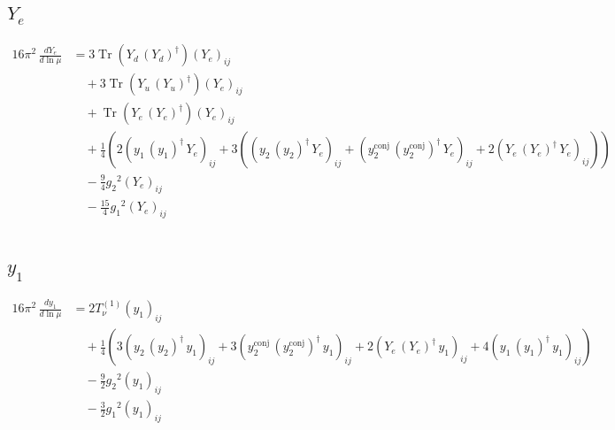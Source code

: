 \documentclass[10pt,a4paper]{article}
\begin{document}
\subsection*{$Y_e$}
\begin{align*}
16\pi^2\,\frac{d Y_e}{d\ln\mu} &=3 \operatorname{Tr}\!\left({Y_d}\,\left({Y_d}\right)^{\dagger}\right) \left({Y_e}\right)_{ij} \\
&\quad +3 \operatorname{Tr}\!\left({Y_u}\,\left({Y_u}\right)^{\dagger}\right) \left({Y_e}\right)_{ij} \\
&\quad +\operatorname{Tr}\!\left({Y_e}\,\left({Y_e}\right)^{\dagger}\right) \left({Y_e}\right)_{ij} \\
&\quad +\frac{1}{4} (2 \left({y_1}\,\left({y_1}\right)^{\dagger}\,{Y_e}\right)_{ij}+3 (\left({y_2}\,\left({y_2}\right)^{\dagger}\,{Y_e}\right)_{ij}+\left({y_{2}^{\mathrm{conj}}}\,\left({y_{2}^{\mathrm{conj}}}\right)^{\dagger}\,{Y_e}\right)_{ij}+2 \left({Y_e}\,\left({Y_e}\right)^{\dagger}\,{Y_e}\right)_{ij})) \\
&\quad -\frac{9}{4} {g_2}^2 \left({Y_e}\right)_{ij} \\
&\quad -\frac{15}{4} {g_1}^2 \left({Y_e}\right)_{ij} \\
\end{align*}
\subsection*{$y_1$}
\begin{align*}
16\pi^2\,\frac{d y_1}{d\ln\mu} &=2 T_{\nu}^{(1)} \left({y_1}\right)_{ij} \\
&\quad +\frac{1}{4} (3 \left({y_2}\,\left({y_2}\right)^{\dagger}\,{y_1}\right)_{ij}+3 \left({y_{2}^{\mathrm{conj}}}\,\left({y_{2}^{\mathrm{conj}}}\right)^{\dagger}\,{y_1}\right)_{ij}+2 \left({Y_e}\,\left({Y_e}\right)^{\dagger}\,{y_1}\right)_{ij}+4 \left({y_1}\,\left({y_1}\right)^{\dagger}\,{y_1}\right)_{ij}) \\
&\quad -\frac{9}{2} {g_2}^2 \left({y_1}\right)_{ij} \\
&\quad -\frac{3}{2} {g_1}^2 \left({y_1}\right)_{ij} \\
\end{align*}
\end{document}
